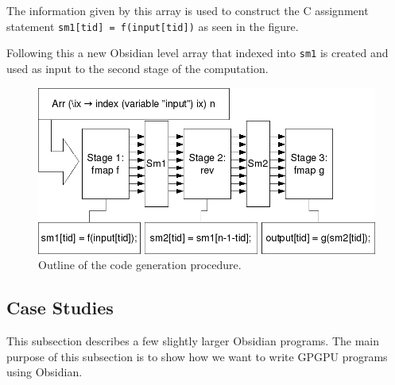 The information given by this array is used to construct the C assignment 
statement {\tt sm1[tid] = f(input[tid])} as seen in the figure.

Following this a new Obsidian level array that indexed into {\tt sm1} is 
created and used as input to the second stage of the computation. 






\begin{figure}
\begin{center}
\includegraphics[width=.65\linewidth]{./papp/pictures/codegenexample.jpg}
\caption{Outline of the code generation procedure.}
\label{fig:codegen}
\end{center}
\end{figure}



\subsection{Case Studies}
\label{sec:CaseStudies}

\FloatBarrier
This subsection describes a few slightly larger Obsidian programs. The main purpose of this subsection is to show 
how we want to write GPGPU programs using Obsidian. 


